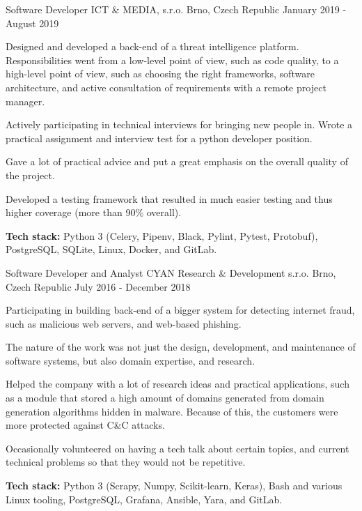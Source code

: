 \begin{cventries}
 	
 \cventry
    {Software Developer}
    {ICT \& MEDIA, s.r.o.}
    {Brno, Czech Republic}
    {January 2019 - August 2019}
    {
      \begin{cvitems}
      	\item {Designed and developed a back-end of a threat intelligence platform. Responsibilities went from a low-level point of view, such as code quality, to a high-level point of view, such as choosing the right frameworks, software architecture, and active consultation of requirements with a remote project manager.}
        \item {Actively participating in technical interviews for bringing new people in. Wrote a practical assignment and interview test for a python developer position.}
        \item {Gave a lot of practical advice and put a great emphasis on the overall quality of the project.}
        \item {Developed a testing framework that resulted in much easier testing and thus higher coverage (more than 90\% overall).}
        \item {{\bodyfont\bfseries\color{darktext}Tech stack:} Python 3 (Celery, Pipenv, Black, Pylint, Pytest, Protobuf), PostgreSQL, SQLite, Linux, Docker, and GitLab.}
      \end{cvitems}
    }

 \cventry
    {Software Developer and Analyst}
    {CYAN Research \& Development s.r.o.}
    {Brno, Czech Republic}
    {July 2016 - December 2018}
    {
      \begin{cvitems}
      	\item {Participating in building back-end of a bigger system for detecting internet fraud, such as malicious web servers, and web-based phishing.}
   	   \item {The nature of the work was not just the design, development, and maintenance of software systems, but also domain expertise, and research.}
        \item {Helped the company with a lot of research ideas and practical applications, such as a module that stored a high amount of domains generated from domain generation algorithms hidden in malware. Because of this, the customers were more protected against C\&C attacks.}
        \item {Occasionally volunteered on having a tech talk about certain topics, and current technical problems so that they would not be repetitive.}
        \item {{\bodyfont\bfseries\color{darktext}Tech stack:} Python 3 (Scrapy, Numpy, Scikit-learn, Keras), Bash and various Linux tooling, PostgreSQL, Grafana, Ansible, Yara, and GitLab.}
      \end{cvitems}
    }
    

\end{cventries}
